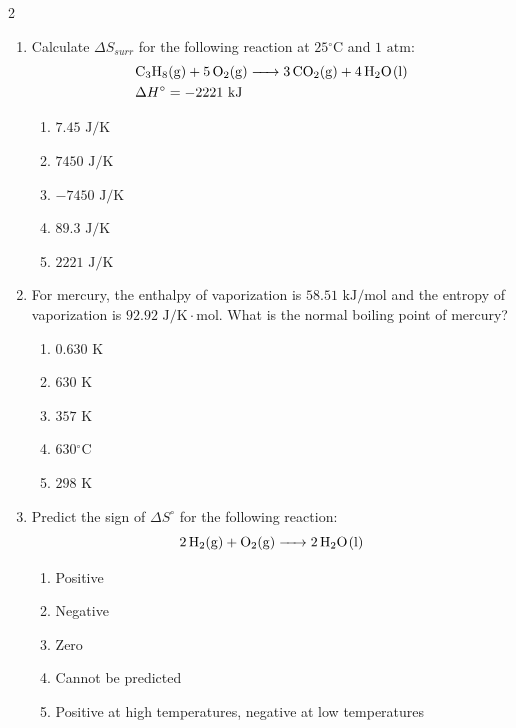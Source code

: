 \documentclass[12pt,letterpaper]{article}
\begin{document}
\begin{multicols*}{2}
\begin{enumerate}
        \item Calculate $\Delta S_{surr}$ for the following reaction at $25\text{}^\circ\text{C}$ and $1\text{ atm}$:
            \begin{align*}
                &\ce{C3H8(g) + 5O2(g) -> 3CO2(g) + 4H2O(l)}\\
                &\Delta H^\circ = -2221\text{ kJ}
            \end{align*}
            \begin{enumerate}
                \item $7.45\text{ J/K}$
                \item $7450\text{ J/K}$
                \item $-7450\text{ J/K}$
                \item $89.3\text{ J/K}$
                \item $2221\text{ J/K}$
            \end{enumerate}

        \item For mercury, the enthalpy of vaporization is $58.51\text{ kJ/mol}$ and the entropy of vaporization is $92.92\text{ J/K}\cdot\text{mol}$. What is the normal boiling point of mercury? %
            \begin{enumerate}
                \item $0.630\text{ K}$
                \item $630\text{ K}$
                \item $357\text{ K}$
                \item $630\text{}^\circ\text{C}$
                \item $298\text{ K}$
            \end{enumerate}

        \item Predict the sign of $\Delta S^\circ$ for the following reaction:
            \begin{equation*}
                \ce{2H2(g) + O2(g) -> 2H2O(l)}
            \end{equation*}
            \begin{enumerate}
                \item Positive
                \item Negative
                \item Zero
                \item Cannot be predicted
                \item Positive at high temperatures, negative at low temperatures
            \end{enumerate}


\end{enumerate}
\end{multicols*}
\end{document}
